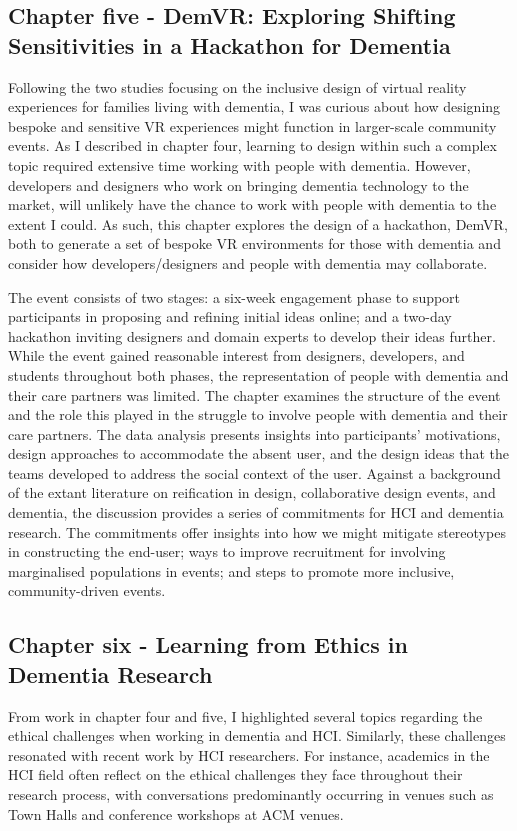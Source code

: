 \subsection{Chapter five - DemVR: Exploring Shifting Sensitivities in a Hackathon for Dementia}
\label{Intro:ChapterFive}
Following the two studies focusing on the inclusive design of virtual reality experiences for families living with dementia, I was curious about how designing bespoke and sensitive VR experiences might function in larger-scale community events. As I described in chapter four, learning to design within such a complex topic required extensive time working with people with dementia. However, developers and designers who work on bringing dementia technology to the market, will unlikely have the chance to work with people with dementia to the extent I could. As such, this chapter explores the design of a hackathon, DemVR, both to generate a set of bespoke VR environments for those with dementia and consider how developers/designers and people with dementia may collaborate.

The event consists of two stages: a six-week engagement phase to support participants in proposing and refining initial ideas online; and a two-day hackathon inviting designers and domain experts to develop their ideas further. While the event gained reasonable interest from designers, developers, and students throughout both phases, the representation of people with dementia and their care partners was limited. The chapter examines the structure of the event and the role this played in the struggle to involve people with dementia and their care partners. The data analysis presents insights into participants’ motivations, design approaches to accommodate the absent user, and the design ideas that the teams developed to address the social context of the user. Against a background of the extant literature on reification in design, collaborative design events, and dementia, the discussion provides a series of commitments for HCI and dementia research. The commitments offer insights into how we might mitigate stereotypes in constructing the end-user; ways to improve recruitment for involving marginalised populations in events; and steps to promote more inclusive, community-driven events. 

\subsection{Chapter six - Learning from Ethics in Dementia Research}
\label{Intro:ChapterSix}
From work in chapter four and five, I highlighted several topics regarding the ethical challenges when working in dementia and HCI. Similarly, these challenges resonated with recent work by HCI researchers. For instance, academics in the HCI field often reflect on the ethical challenges they face throughout their research process, with conversations predominantly occurring in venues such as Town Halls and conference workshops at ACM venues.

